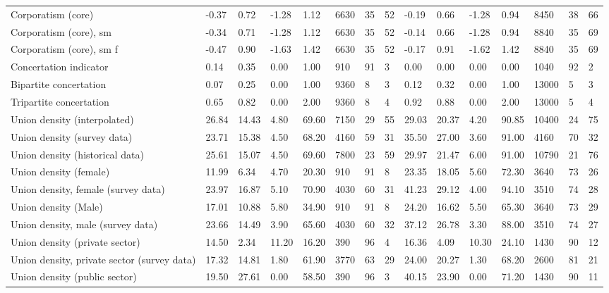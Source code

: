\begin{longtable}{lllllllllllllll}
Corporatism (core) & -0.37 & 0.72 & -1.28 & 1.12 & 6630 & 35 & 52 & -0.19 & 0.66 & -1.28 & 0.94 & 8450 & 38 & 66\\
\addlinespace
Corporatism (core), sm & -0.34 & 0.71 & -1.28 & 1.12 & 6630 & 35 & 52 & -0.14 & 0.66 & -1.28 & 0.94 & 8840 & 35 & 69\\
Corporatism (core), sm f & -0.47 & 0.90 & -1.63 & 1.42 & 6630 & 35 & 52 & -0.17 & 0.91 & -1.62 & 1.42 & 8840 & 35 & 69\\
Concertation indicator & 0.14 & 0.35 & 0.00 & 1.00 & 910 & 91 & 3 & 0.00 & 0.00 & 0.00 & 0.00 & 1040 & 92 & 2\\
Bipartite concertation & 0.07 & 0.25 & 0.00 & 1.00 & 9360 & 8 & 3 & 0.12 & 0.32 & 0.00 & 1.00 & 13000 & 5 & 3\\
Tripartite concertation & 0.65 & 0.82 & 0.00 & 2.00 & 9360 & 8 & 4 & 0.92 & 0.88 & 0.00 & 2.00 & 13000 & 5 & 4\\
\addlinespace
Union density (interpolated) & 26.84 & 14.43 & 4.80 & 69.60 & 7150 & 29 & 55 & 29.03 & 20.37 & 4.20 & 90.85 & 10400 & 24 & 75\\
Union density (survey data) & 23.71 & 15.38 & 4.50 & 68.20 & 4160 & 59 & 31 & 35.50 & 27.00 & 3.60 & 91.00 & 4160 & 70 & 32\\
Union density (historical data) & 25.61 & 15.07 & 4.50 & 69.60 & 7800 & 23 & 59 & 29.97 & 21.47 & 6.00 & 91.00 & 10790 & 21 & 76\\
Union density (female) & 11.99 & 6.34 & 4.70 & 20.30 & 910 & 91 & 8 & 23.35 & 18.05 & 5.60 & 72.30 & 3640 & 73 & 26\\
Union density, female (survey data) & 23.97 & 16.87 & 5.10 & 70.90 & 4030 & 60 & 31 & 41.23 & 29.12 & 4.00 & 94.10 & 3510 & 74 & 28\\
\addlinespace
Union density (Male) & 17.01 & 10.88 & 5.80 & 34.90 & 910 & 91 & 8 & 24.20 & 16.62 & 5.50 & 65.30 & 3640 & 73 & 29\\
Union density, male (survey data) & 23.66 & 14.49 & 3.90 & 65.60 & 4030 & 60 & 32 & 37.12 & 26.78 & 3.30 & 88.00 & 3510 & 74 & 27\\
Union density (private sector) & 14.50 & 2.34 & 11.20 & 16.20 & 390 & 96 & 4 & 16.36 & 4.09 & 10.30 & 24.10 & 1430 & 90 & 12\\
Union density, private sector (survey data) & 17.32 & 14.81 & 1.80 & 61.90 & 3770 & 63 & 29 & 24.00 & 20.27 & 1.30 & 68.20 & 2600 & 81 & 21\\
Union density (public sector) & 19.50 & 27.61 & 0.00 & 58.50 & 390 & 96 & 3 & 40.15 & 23.90 & 0.00 & 71.20 & 1430 & 90 & 11\\

\end{longtable}
